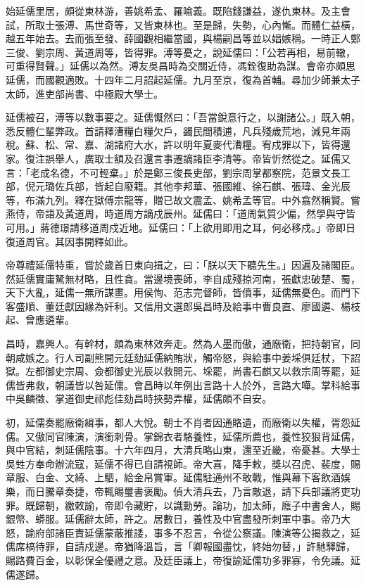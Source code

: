 \begin{pinyinscope}
始延儒里居，頗從東林游，善姚希孟、羅喻義。既陷錢謙益，遂仇東林。及主會試，所取士張溥、馬世奇等，又皆東林也。至是歸，失勢，心內慚。而體仁益橫，越五年始去。去而張至發、薛國觀相繼當國，與楊嗣昌等並以娼嫉稱。一時正人鄭三俊、劉宗周、黃道周等，皆得罪。溥等憂之，說延儒曰：「公若再相，易前轍，可重得賢聲。」延儒以為然。溥友吳昌時為交關近侍，馮銓復助為謀。會帝亦頗思延儒，而國觀適敗。十四年二月詔起延儒。九月至京，復為首輔。尋加少師兼太子太師，進吏部尚書、中極殿大學士。

延儒被召，溥等以數事要之。延儒慨然曰：「吾當銳意行之，以謝諸公。」既入朝，悉反體仁輩弊政。首請釋漕糧白糧欠戶，蠲民間積逋，凡兵殘歲荒地，減見年兩稅。蘇、松、常、嘉、湖諸府大水，許以明年夏麥代漕糧。宥戍罪以下，皆得還家。復注誤舉人，廣取士額及召還言事遷謫諸臣李清等。帝皆忻然從之。延儒又言：「老成名德，不可輕棄。」於是鄭三俊長吏部，劉宗周掌都察院，范景文長工部，倪元璐佐兵部，皆起自廢籍。其他李邦華、張國維、徐石麒、張瑋、金光辰等，布滿九列。釋在獄傅宗龍等，贈已故文震孟、姚希孟等官。中外翕然稱賢。嘗燕侍，帝語及黃道周，時道周方謫戍辰州。延儒曰：「道周氣質少偏，然學與守皆可用。」蔣德璟請移道周戍近地。延儒曰：「上欲用即用之耳，何必移戍。」帝即日復道周官。其因事開釋如此。

帝尊禮延儒特重，嘗於歲首日東向揖之，曰：「朕以天下聽先生。」因遍及諸閣臣。然延儒實庸駑無材略，且性貪。當邊境喪師，李自成殘掠河南，張獻忠破楚、蜀，天下大亂，延儒一無所謀畫。用侯恂、范志完督師，皆僨事，延儒無憂色。而門下客盛順、董廷獻因緣為奸利。又信用文選郎吳昌時及給事中曹良直、廖國遴、楊枝起、曾應遴輩。

昌時，嘉興人。有幹材，頗為東林效奔走。然為人墨而傲，通廠衛，把持朝官，同朝咸嫉之。行人司副熊開元廷劾延儒納賄狀，觸帝怒，與給事中姜埰俱廷杖，下詔獄。左都御史宗周、僉都御史光辰以救開元、埰罷，尚書石麒又以救宗周等罷，延儒皆弗救，朝議皆以咎延儒。會昌時以年例出言路十人於外，言路大嘩。掌科給事中吳麟徵、掌道御史祁彪佳劾昌時挾勢弄權，延儒頗不自安。

初，延儒奏罷廠衛緝事，都人大悅。朝士不肖者因通賂遺，而廠衛以失權，胥怨延儒。又傲同官陳演，演銜刺骨。掌錦衣者駱養性，延儒所薦也，養性狡狠背延儒，與中官結，刺延儒陰事。十六年四月，大清兵略山東，還至近畿，帝憂甚。大學士吳甡方奉命辦流寇，延儒不得已自請視師。帝大喜，降手敕，獎以召虎、裴度，賜章服、白金、文綺、上駟，給金帛賞軍。延儒駐通州不敢戰，惟與幕下客飲酒娛樂，而日騰章奏捷，帝輒賜璽書褒勵。偵大清兵去，乃言敵退，請下兵部議將吏功罪。既歸朝，繳敕諭，帝即令藏貯，以識勳勞。論功，加太師，廕子中書舍人，賜銀幣、蟒服。延儒辭太師，許之。居數日，養性及中官盡發所刺軍中事。帝乃大怒，諭府部諸臣責延儒蒙蔽推諉，事多不忍言，令從公察議。陳演等公揭救之，延儒席槁待罪，自請戍邊。帝猶降溫旨，言「卿報國盡忱，終始勿替，」許馳驛歸，賜路費百金，以彰保全優禮之意。及廷臣議上，帝復諭延儒功多罪寡，令免議。延儒遂歸。


\end{pinyinscope}
